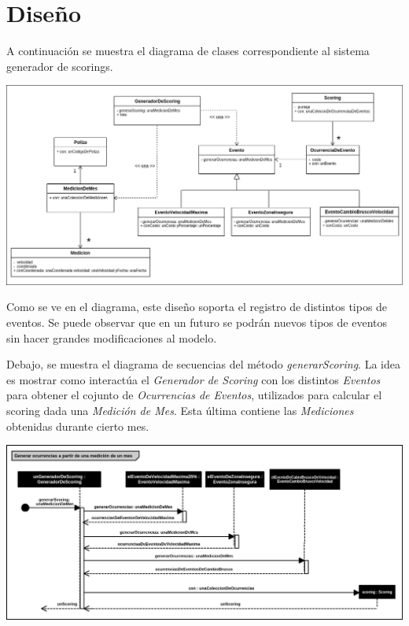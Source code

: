 \section{Diseño}

A continuación se muestra el diagrama de clases correspondiente al sistema generador 
de scorings.
\newline

\centerline{\includegraphics[width=1\textwidth]{./imagenes/clases.png}}


Como se ve en el diagrama, este diseño soporta el registro de distintos tipos de 
eventos. Se puede observar que en un futuro se podrán nuevos tipos de eventos 
sin hacer grandes modificaciones al modelo.


Debajo, se muestra el diagrama de secuencias del método \textit{generarScoring}.
La idea es mostrar como interactúa el \textit{Generador de Scoring} con los distintos
\textit{Eventos} para obtener el cojunto de \textit{Ocurrencias de Eventos}, utilizados
para calcular el scoring dada una \textit{Medición de Mes}. Esta última contiene las 
\textit{Mediciones} obtenidas durante cierto mes.
\newline

\centerline{\includegraphics[width=1\textwidth]{./imagenes/secuencias_general.png}}


